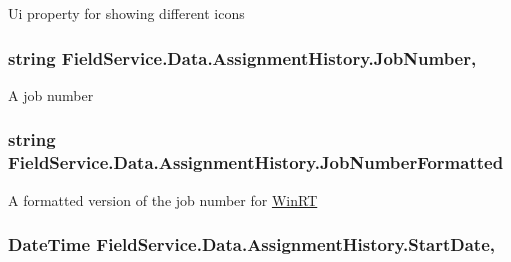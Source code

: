 Ui property for showing different icons 

\hypertarget{class_field_service_1_1_data_1_1_assignment_history_aab7d91362df0bd7ba10cc38e4f1453f9}{
\subsubsection[{Job\+Number}]{\setlength{\rightskip}{0pt plus 5cm}string Field\+Service.\+Data.\+Assignment\+History.\+Job\+Number\hspace{0.3cm}{\ttfamily [get]}, {\ttfamily [set]}}}\label{class_field_service_1_1_data_1_1_assignment_history_aab7d91362df0bd7ba10cc38e4f1453f9}


A job number 

\hypertarget{class_field_service_1_1_data_1_1_assignment_history_a4ad7d1dfbe64a441168a4b2564d4a32e}{
\subsubsection[{Job\+Number\+Formatted}]{\setlength{\rightskip}{0pt plus 5cm}string Field\+Service.\+Data.\+Assignment\+History.\+Job\+Number\+Formatted\hspace{0.3cm}{\ttfamily [get]}}}\label{class_field_service_1_1_data_1_1_assignment_history_a4ad7d1dfbe64a441168a4b2564d4a32e}


A formatted version of the job number for \hyperlink{namespace_field_service_1_1_win_r_t}{Win\+R\+T} 

\hypertarget{class_field_service_1_1_data_1_1_assignment_history_a39f1120335a45caf7d9a87fde2bed323}{
\subsubsection[{Start\+Date}]{\setlength{\rightskip}{0pt plus 5cm}Date\+Time Field\+Service.\+Data.\+Assignment\+History.\+Start\+Date\hspace{0.3cm}{\ttfamily [get]}, {\ttfamily [set]}}}\label{class_field_service_1_1_data_1_1_assignment_history_a39f1120335a45caf7d9a87fde2bed323}


